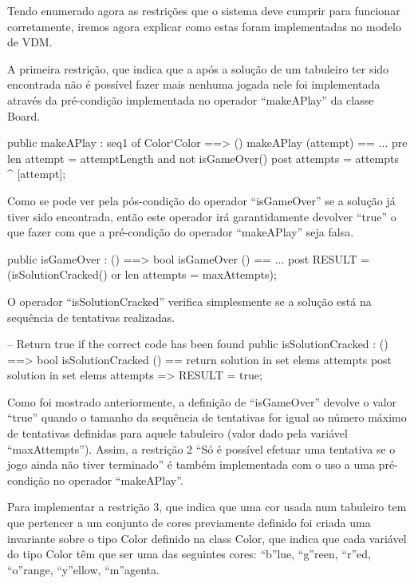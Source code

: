 
Tendo enumerado agora as restrições que o sistema deve cumprir para
funcionar corretamente, iremos agora explicar como estas foram
implementadas no modelo de VDM.

A primeira restrição, que indica que a após a solução de um tabuleiro
ter sido encontrada não é possível fazer mais nenhuma jogada nele foi
implementada através da pré-condição implementada no operador
``makeAPlay'' da classe Board.

\begin{vdm_al}
  public makeAPlay : seq1 of Color`Color ==> ()
  makeAPlay (attempt) == ...
  pre len attempt = attemptLength and
      not isGameOver()
  post attempts = attempts~ ^ [attempt];
\end{vdm_al}

Como se pode ver pela pós-condição do operador ``isGameOver'' se a
solução já tiver sido encontrada, então este operador irá
garantidamente devolver ``true'' o que fazer com que a pré-condição do
operador ``makeAPlay'' seja falsa.

\begin{vdm_al}
  public isGameOver : () ==> bool
    isGameOver () == ...
  post RESULT = (isSolutionCracked() or len attempts = maxAttempts);
\end{vdm_al}

O operador ``isSolutionCracked'' verifica simplesmente se a solução
está na sequência de tentativas realizadas.

\begin{vdm_al}
  -- Return true if the correct code has been found
  public isSolutionCracked : () ==> bool
    isSolutionCracked () == return solution in set elems attempts
  post solution in set elems attempts => RESULT = true;
\end{vdm_al}

Como foi mostrado anteriormente, a definição de ``isGameOver'' devolve
o valor ``true'' quando o tamanho da sequência de tentativas for igual
ao número máximo de tentativas definidas para aquele tabuleiro (valor
dado pela variável ``maxAttempts''). Assim, a restrição 2 ``Só é
possível efetuar uma tentativa se o jogo ainda não tiver terminado'' é
também implementada com o uso a uma pré-condição no operador
``makeAPlay''.

Para implementar a restrição 3, que indica que uma cor usada num
tabuleiro tem que pertencer a um conjunto de cores previamente
definido foi criada uma invariante sobre o tipo Color definido na
class Color, que indica que cada variável do tipo Color têm que ser
uma das seguintes cores: ``b''lue, ``g''reen, ``r''ed, ``o''range,
``y''ellow, ``m''agenta.

